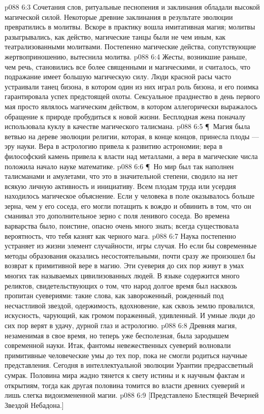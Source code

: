 \vs p088 6:3 Сочетания слов, ритуальные песнопения и заклинания обладали высокой магической силой. Некоторые древние заклинания в результате эволюции превратились в молитвы. Вскоре в практику вошла имитативная магия; молитвы разыгрывались, как действо, магические танцы были не чем иным, как театрализованными молитвами. Постепенно магические действа, сопутствующие жертвоприношению, вытеснила молитва.
\vs p088 6:4 Жесты, возникшие раньше, чем речь, становились все более священными и магическими, и считалось, что подражание имеет большую магическую силу. Люди красной расы часто устраивали танец бизона, в котором один из них играл роль бизона, и его поимка гарантировала успех предстоящей охоты. Сексуальное празднество в день первого мая просто являлось магическим действом, в котором аллегорически выражалось обращение к природе пробудиться к новой жизни. Бесплодная жена поначалу использовала куклу в качестве магического талисмана.
\vs p088 6:5 \P\ Магия была ветвью на дереве эволюции религии, которая, в конце концов, принесла плоды --- эру науки. Вера в астрологию привела к развитию астрономии; вера в философский камень привела к власти над металлами, а вера в магические числа положила начало науке математике.
\vs p088 6:6 \P\ Но мир был так наполнен талисманами и амулетами, что это в значительной степени, сводило на нет всякую личную активность и инициативу. Всем плодам труда или усердия находилось магическое объяснение. Если у человека в поле оказывалось больше зерна, чем у его соседа, его могли потащить к вождю и обвинить в том, что он сманивал это дополнительное зерно с поля ленивого соседа. Во времена варварства было, поистине, опасно очень много знать; всегда существовала вероятность, что тебя казнят как черного мага.
\vs p088 6:7 Наука постепенно устраняет из жизни элемент случайности, игры случая. Но если бы современные методы образования оказались несостоятельными, почти сразу же произошел бы возврат к примитивной вере в магию. Эти суеверия до сих пор живут в умах многих так называемых цивилизованных людей. В языке содержится много реликтов, свидетельствующих о том, что народ долгое время был насквозь пропитан суевериями: такие слова, как завороженный, рожденный под несчастливой звездой, одержимость, вдохновение, как сквозь землю провалился, искусность, чарующий, как громом пораженный, удивленный. И умные люди до сих пор верят в удачу, дурной глаз и астрологию.
\vs p088 6:8 Древняя магия, незаменимая в свое время, но теперь уже бесполезная, была зародышем современной науки. Итак, фантомы невежественных суеверий волновали примитивные человеческие умы до тех пор, пока не смогли родиться научные представления. Сегодня в интеллектуальной эволюции Урантии предрассветный сумрак. Половина мира жадно тянется к свету истины и к научным фактам и открытиям, тогда как другая половина томится во власти древних суеверий и лишь слегка видоизмененной магии.
\vs p088 6:9 [Представлено Блестящей Вечерней Звездой Небадона.]
